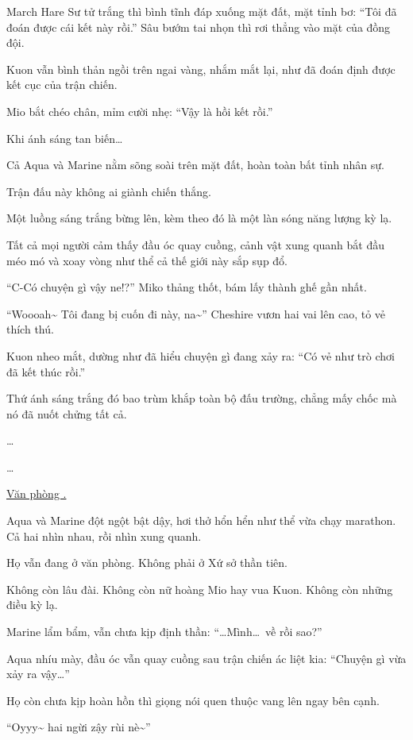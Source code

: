 \documentclass[../main.tex]{subfiles}
\begin{document}
March Hare Sư tử trắng thì bình tĩnh đáp xuống mặt đất, mặt tỉnh bơ: ``Tôi đã đoán được cái kết này rồi.'' Sâu bướm tai nhọn thì rơi thẳng vào mặt của đồng đội.

Kuon vẫn bình thản ngồi trên ngai vàng, nhắm mắt lại, như đã đoán định được kết cục của trận chiến.

Mio bắt chéo chân, mỉm cười nhẹ: ``Vậy là hồi kết rồi.''

Khi ánh sáng tan biến\dots

Cả Aqua và Marine nằm sõng soài trên mặt đất, hoàn toàn bất tỉnh nhân sự.

Trận đấu này không ai giành chiến thắng.

Một luồng sáng trắng bừng lên, kèm theo đó là một làn sóng năng lượng kỳ lạ.

Tất cả mọi người cảm thấy đầu óc quay cuồng, cảnh vật xung quanh bắt đầu méo mó và xoay vòng như thể cả thế giới này sắp sụp đổ.

``C-Có chuyện gì vậy ne!?'' Miko thảng thốt, bám lấy thành ghế gần nhất.

``Woooah\~{} Tôi đang bị cuốn đi này, na\~{}'' Cheshire vươn hai vai lên cao, tỏ vẻ thích thú.

Kuon nheo mắt, dường như đã hiểu chuyện gì đang xảy ra: ``Có vẻ như trò chơi đã kết thúc rồi.''

Thứ ánh sáng trắng đó bao trùm khắp toàn bộ đấu trường, chẳng mấy chốc mà nó đã nuốt chửng tất cả.

\dots

\dots

\ct

\begin{center}
    \uline{Văn phòng \hll.}
\end{center}

Aqua và Marine đột ngột bật dậy, hơi thở hổn hển như thể vừa chạy marathon. Cả hai nhìn nhau, rồi nhìn xung quanh.

Họ vẫn đang ở văn phòng. Không phải ở Xứ sở thần tiên.

Không còn lâu đài. Không còn nữ hoàng Mio hay vua Kuon. Không còn những điều kỳ lạ.

Marine lẩm bẩm, vẫn chưa kịp định thần:
``\dots Mình\dots\ về rồi sao?''

Aqua nhíu mày, đầu óc vẫn quay cuồng sau trận chiến ác liệt kia: ``Chuyện gì vừa xảy ra vậy\dots''

Họ còn chưa kịp hoàn hồn thì giọng nói quen thuộc vang lên ngay bên cạnh.

``Oyyy\~{} hai ngừi zậy rùi nè\~{}''
\end{document}
